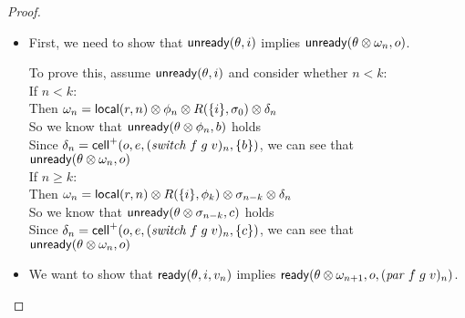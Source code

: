 \begin{proof}
\begin{itemize}
\item First, we need to show that $\mathsf{unready}({\theta}, {i})$ implies $\mathsf{unready}({\theta \otimes \omega_n}, {o})$. 

  \begin{tabbedproof}
    \oo To prove this, assume $\mathsf{unready}({\theta}, {i})$ and consider whether $n < k$:\\
    \oo If $n < k$:\\
    \ooo Then $\omega_n = \mathsf{local}({r}, {n}) \otimes \phi_n \otimes R(\{{i}\}, \sigma_0) \otimes \delta_n$ \\
    \ooo So we know that $\mathsf{unready}({\theta \otimes \phi_n}, {b})$ holds \\
    \ooo Since $\delta_n = \mathsf{cell}^{+}({o}, {e}, {(\mathit{switch}\;f\;g\;v)_n}, {\{{b}\}})$, we can see that \\
    \ooo $\mathsf{unready}({\theta \otimes \omega_n}, {o})$ \\
    \oo If $n \geq k$: \\
    \ooo Then $\omega_n = \mathsf{local}({r}, {n}) \otimes R(\{{i}\}, \phi_k) \otimes \sigma_{n-k} \otimes \delta_n$ \\
    \ooo So we know that $\mathsf{unready}({\theta \otimes \sigma_{n-k}}, {c})$ holds \\
    \ooo Since $\delta_n = \mathsf{cell}^{+}({o}, {e}, {(\mathit{switch}\;f\;g\;v)_n}, {\{{c}\}})$, we can see that \\
    \ooo $\mathsf{unready}({\theta \otimes \omega_n}, {o})$ \\
  \end{tabbedproof}

\item We want to show that $\mathsf{ready}({\theta}, {i}, {v_n})$ implies $\mathsf{ready}({\theta \otimes \omega_{n+1}}, {o}, {(\mathit{par}\;f\;g\;v)_n})$. 


\end{itemize}
\end{proof}
